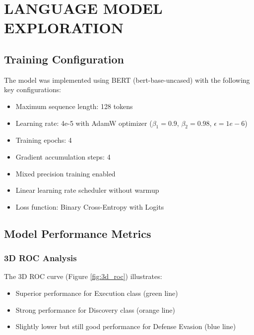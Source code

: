 
\section{LANGUAGE MODEL EXPLORATION}

    
    \subsection{Training Configuration}

        The model was implemented using BERT (bert-base-uncased) with the following key configurations:
        \begin{itemize}
            \item Maximum sequence length: 128 tokens
            \item Learning rate: 4e-5 with AdamW optimizer ($\beta_1=0.9$, $\beta_2=0.98$, $\epsilon=1e-6$)
            \item Training epochs: 4
            \item Gradient accumulation steps: 4
            \item Mixed precision training enabled
            \item Linear learning rate scheduler without warmup
            \item Loss function: Binary Cross-Entropy with Logits
        \end{itemize}
        
    \subsection{Model Performance Metrics}

        \subsubsection{3D ROC Analysis}

            The 3D ROC curve (Figure \ref{fig:3d_roc}) illustrates:

            \begin{itemize}
                \item Superior performance for Execution class (green line)
                \item Strong performance for Discovery class (orange line)
                \item Slightly lower but still good performance for Defense Evasion (blue line)
            \end{itemize}

